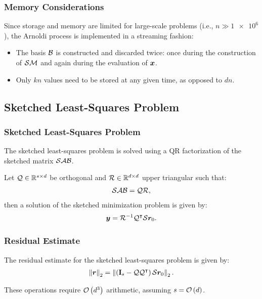 
\begin{frame}
    \frametitle{Memory Considerations}

    Since storage and memory are limited for large-scale problems (i.e., $n \gg \num{1e6}$), the Arnoldi process is implemented in a streaming fashion:
    \begin{itemize}
        \item The basis $\mathcal{B}$ is constructed and discarded twice: once during the construction of $\mathcal{S} \mathcal{M}$ and again during the evaluation of $\bm{x}$.
        \item Only $k n$ values need to be stored at any given time, as opposed to $d n$.
    \end{itemize}
\end{frame}

\subsection{Sketched Least-Squares Problem}

\begin{frame}
    \frametitle{Sketched Least-Squares Problem}

    The sketched least-squares problem is solved using a QR factorization of the sketched matrix $\mathcal{S} \mathcal{A} \mathcal{B}$.

    Let $\mathcal{Q} \in \mathbb{R}^{s \times d}$ be orthogonal and $\mathcal{R} \in \mathbb{R}^{d \times d}$ upper triangular such that:
    \begin{align}
        \mathcal{S} \mathcal{A} \mathcal{B} = \mathcal{Q} \mathcal{R},
    \end{align}
    then a solution of the sketched minimization problem is given by:
    \begin{align}
        \bm{y} = \mathcal{R}^{-1} \mathcal{Q}^{\intercal} \mathcal{S} \bm{r}_0.
    \end{align}
\end{frame}

\begin{frame}
    \frametitle{Residual Estimate}

    The residual estimate for the sketched least-squares problem is given by:
    \begin{align}
        \left\lVert \bm{r} \right\rVert_2 = \left\lVert  \left( \mathbf{I}_s - \mathcal{Q} \mathcal{Q}^{\intercal} \right) \mathcal{S} \bm{r}_0  \right\rVert_2.
    \end{align}
    
    These operations require $\mathcal{O} \left( d^3 \right)$ arithmetic, assuming $s = \mathcal{O} \left( d \right)$.
\end{frame}

